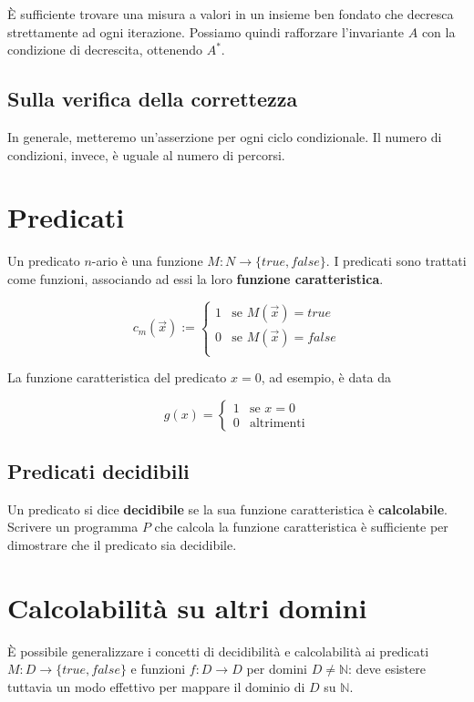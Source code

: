 	È sufficiente trovare una misura a valori in un insieme ben fondato che decresca strettamente ad ogni iterazione. Possiamo quindi rafforzare l'invariante $A$ con la condizione di decrescita, ottenendo $A^*$. 
	
	\subsection{Sulla verifica della correttezza}
	In generale, metteremo un'asserzione per ogni ciclo condizionale. Il numero di condizioni, invece, è uguale al numero di percorsi.
	
	\section{Predicati}
	Un predicato $n$-ario è una funzione $M : N \to \{true, false\}$. I predicati sono trattati come funzioni, associando ad essi la loro \textbf{funzione caratteristica}.
	
	$$
	c_m(\vec{x}):= \begin{cases}
	1 & \text{se }M(\vec{x})= true\\
	0 & \text{se }M(\vec{x})= false\\
	\end{cases}
	$$
	
	La funzione caratteristica del predicato $x = 0$, ad esempio, è data da
	
	$$
	g(x) = \begin{cases}
	1 & \text{se } x = 0\\
	0 & \text{altrimenti}
	\end{cases}
	$$
	
	\subsection{Predicati decidibili}
	Un predicato si dice \textbf{decidibile} se la sua funzione caratteristica è \textbf{calcolabile}. Scrivere un programma $P$ che calcola la funzione caratteristica è sufficiente per dimostrare che il predicato sia decidibile.
	
	\section{Calcolabilità su altri domini}
	È possibile generalizzare i concetti di decidibilità e calcolabilità ai predicati $M: D \to \{true, false\}$ e funzioni $f : D \to D$ per domini $D \neq \mathbb{N}$: deve esistere tuttavia un modo effettivo per mappare il dominio di $D$ su $\mathbb{N}$.
	
